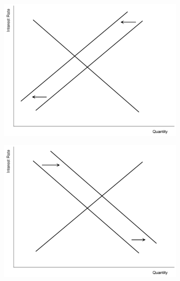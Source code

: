 \documentclass[addpoints,11pt]{exam}
\theoremstyle{definition}
\begin{document}
\begin{questions}
\begin{figure}[H]
	\begin{subfigure}[b]{0.5\textwidth}
		\centering
	\includegraphics[scale=.35]{loans1.pdf}
		\caption{}
	\end{subfigure}
	\begin{subfigure}[b]{0.5\textwidth}
		\centering
	\includegraphics[scale=.35]{loans2.pdf}
		\caption{}
	\end{subfigure}
		

\end{figure}
\end{questions}
\end{document}
